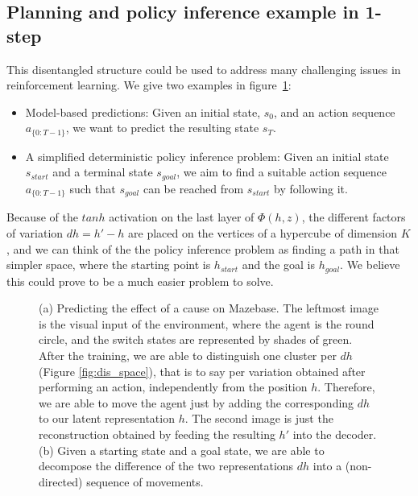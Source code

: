 \subsection{Planning and policy inference example in 1-step}
\label{sec:exp-mb-ppi}

This disentangled structure could be used to address many challenging issues in reinforcement learning. We give two examples in figure~\ref{fig:prediction_recovering}: 
\begin{itemize}
\item Model-based predictions: Given an initial state, $s_0$, and an action sequence $a_{\{0:T-1\}}$, %
we want to predict the resulting state $s_T$.

\item A simplified deterministic policy inference problem: Given an initial state $s_{start}$ and a terminal state $s_{goal}$, we aim to find a suitable action sequence $a_{\{0:T-1\}}$ such that $s_{goal}$ can be reached from $s_{start}$ by following it.
\end{itemize}
Because of the $tanh$ activation on the last layer of $\Phi(h, z)$, the different factors of variation $dh = h' - h$ are placed on the vertices of a hypercube of dimension $K$, and we can think of the the policy inference problem as finding a path in that simpler space, where the starting point is $h_{start}$ and the goal is $h_{goal}$. We believe this could prove to be a much easier problem to solve.

\begin{figure}[H]
\centering
\subfloat[]{}
\hfill
\subfloat[]{} %
\caption{(a) Predicting the effect of a cause on Mazebase. The leftmost image is the visual input of the environment, where the agent is the round circle, and the switch states are represented by shades of green. After the training, we are able to distinguish one cluster per $dh$ (Figure \ref{fig:dis_space}), that is to say per variation obtained after performing an action, independently from the position $h$. Therefore, we are able to move the agent just by adding the corresponding $dh$ to our latent representation $h$. The second image is just the reconstruction obtained by feeding the resulting $h'$ into the decoder. (b) Given a starting state and a goal state, we are able to decompose the difference of the two representations $dh$ into a (non-directed) sequence of movements.}
\label{fig:prediction_recovering}
\end{figure}

